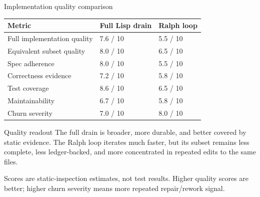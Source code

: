 \documentclass[aspectratio=169]{beamer}
\begin{document}
\begin{frame}{Implementation quality comparison}
\small
\begin{tabular}{p{}p{}p{}}
\textbf{Metric} & \textbf{Full Lisp drain} & \textbf{Ralph loop} \\
\hline
Full implementation quality & 7.6 / 10 & 5.5 / 10 \\
Equivalent subset quality & 8.0 / 10 & 6.5 / 10 \\
Spec adherence & 8.0 / 10 & 5.5 / 10 \\
Correctness evidence & 7.2 / 10 & 5.8 / 10 \\
Test coverage & 8.6 / 10 & 6.5 / 10 \\
Maintainability & 6.7 / 10 & 5.8 / 10 \\
Churn severity & 7.0 / 10 & 8.0 / 10 \\
\end{tabular}
\vspace{0.8em}
\begin{block}{Quality readout}
The full drain is broader, more durable, and better covered by static evidence. The Ralph loop iterates much faster, but its subset remains less complete, less ledger-backed, and more concentrated in repeated edits to the same files.
\end{block}
\vspace{0.3em}
\footnotesize
Scores are static-inspection estimates, not test results. Higher quality scores are better; higher churn severity means more repeated repair/rework signal.
\end{frame}
\end{document}
